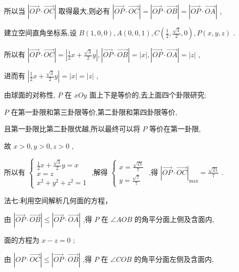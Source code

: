 \documentclass[10pt]{article}
\newcommand*\circled[1]{\tikz[baseline=(char.base)]{\node[shape=circle,draw,inner sep=1.5pt] (char) {\small #1};}}
\begin{document}
所以当 \(\left| {\overrightarrow{OP} \cdot  \overrightarrow{OC}}\right|\) 取得最大,则必有 \(\left| {\overrightarrow{OP} \cdot  \overrightarrow{OC}}\right|  = \left| {\overrightarrow{OP} \cdot  \overrightarrow{OB}}\right|  = \left| {\overrightarrow{OP} \cdot  \overrightarrow{OA}}\right|\) ,

建立空间直角坐标系,设 \(B\left( {1,0,0}\right) ,A\left( {0,0,1}\right) ,C\left( {\frac{1}{2},\frac{\sqrt{3}}{2},0}\right) ,P\left( {x,y,z}\right)\) .

所以有 \(\left| {\overrightarrow{OP} \cdot  \overrightarrow{OC}}\right|  = \left| {\frac{1}{2}x + \frac{\sqrt{3}}{2}y}\right| ,\left| {\overrightarrow{OP} \cdot  \overrightarrow{OB}}\right|  = \left| x\right| ,\left| {\overrightarrow{OP} \cdot  \overrightarrow{OA}}\right|  = \left| z\right|\) ,

进而有 \(\left| {\frac{1}{2}x + \frac{\sqrt{3}}{2}y}\right|  = \left| x\right|  = \left| z\right|\)  \circled{1} ,

由球面的对称性, \(P\) 在 \({xOy}\) 面上下是等价的,去上面四个卦限研究;

\(P\) 在第一卦限和第三卦限等价,第二卦限和第四卦限等价,

且第一卦限比第二卦限优越,所以最终可以将 \(P\) 等价在第一卦限,

故 \(x > 0,y > 0,z > 0\) ,

所以有 \(\left\{  \begin{array}{l} \frac{1}{2}x + \frac{\sqrt{3}}{2}y = x \\  x = z \\  {x}^{2} + {y}^{2} + {z}^{2} = 1 \end{array}\right.\) ,解得 \(\left\{  \begin{array}{l} x = \frac{\sqrt{21}}{7} \\  y = \frac{\sqrt{7}}{7} \end{array}\right.\) ,得 \({\left| \overrightarrow{OP} \cdot  \overrightarrow{OC}\right| }_{\max } = \frac{\sqrt{21}}{7}\) .

法七:利用空间解析几何面的方程，

由 \(\left| {\overrightarrow{OP} \cdot  \overrightarrow{OB}}\right|  \leq  \left| {\overrightarrow{OP} \cdot  \overrightarrow{OA}}\right|\) ,得 \(P\) 在 \(\angle {AOB}\) 的角平分面上侧及含面内,

面的方程为 \(x - z = 0\) ;

由 \(\left| {{OP} \cdot  \overrightarrow{OC}}\right|  \leq  \left| {\overrightarrow{OP} \cdot  \overrightarrow{OB}}\right|\) ,得 \(P\) 在 \(\angle {COB}\) 的角平分面左侧及含面内,
\end{document}

